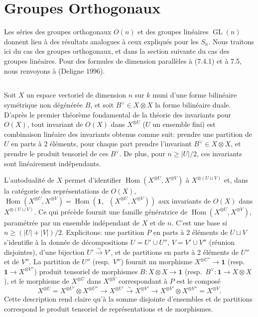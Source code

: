 \documentclass[11pt,a4paper]{article}
\theoremstyle{plain}
\theoremstyle{definition}
\DeclareMathOperator{\Hom}{Hom}
\DeclareMathOperator{\GL}{GL}
\newcommand{\isom}{\xrightarrow{\sim}}
\DeclareMathOperator{\iHom}{\underline{Hom}}
\begin{document}
\section{Groupes Orthogonaux}

Les s\'eries des groupes orthogonaux $O(n)$ et des groupes lin\'eaires $\GL(n)$ donnent lieu \`a des r\'esultats analogues \`a ceux expliqu\'es pour les $S_n$. Nous traitons ici du cas des groupes orthogonaux, et dans la section suivante du cas des groupes lin\'eaires. Pour des formules de dimension parall\`eles \`a (7.4.1) et \`a 7.5, nous renvoyons \`a (Deligne 1996).

\subsection{}
Soit $X$ un espace vectoriel de dimension $n$ sur $k$ muni d'une forme bilin\'eaire sym\'etrique non d\'eg\'en\'er\'ee $B$, et soit $B^\vee \in X \otimes X$ la forme bilin\'eaire duale. D'apr\`es le premier th\'eor\`eme fondamental de la th\'eorie des invariants pour $O(X)$, tout invariant de $O(X)$ dans $X^{\otimes U}$ ($U$ un ensemble fini) est combinaison lin\'eaire des invariants obtenus comme suit: prendre une partition de $U$ en parts \`a 2 \'el\'ements, pour chaque part prendre l'invariant $B^\vee \in X \otimes X$, et prendre le produit tensoriel de ces $B^\vee$. De plus, pour $n \geq |U|/2$, ces invariants sont lin\'eairement ind\'ependants.

L'autodualit\'e de $X$ permet d'identifier $\Hom(X^{\otimes U}, X^{\otimes V})$ \`a $X^{\otimes (U \sqcup V)}$ et, dans la cat\'egorie des repr\'esentations de $O(X)$, $\Hom(X^{\otimes U}, X^{\otimes V}) = \Hom(\mathbf{1}, \iHom(X^{\otimes U}, X^{\otimes V}))$ aux invariants de $O(X)$ dans $X^{\otimes (U \sqcup V)}$. Ce qui pr\'ec\`ede fournit une famille g\'en\'eratrice de $\Hom(X^{\otimes U}, X^{\otimes V})$, param\'etr\'ee par un ensemble ind\'ependant de $X$ et de $n$. C'est une base si $n \geq (|U| + |V|)/2$. Explicitons: une partition $P$ en parts \`a 2 \'el\'ements de $U \sqcup V$ s'identifie \`a la donn\'ee de d\'ecompositions $U = U' \cup U''$, $V = V' \cup V''$ (r\'eunion disjointes), d'une bijection $U' \isom V'$, et de partitions en parts \`a 2 \'el\'ements de $U''$ et de $V''$. La partition de $U''$ (resp.~$V''$) fournit un morphisme $X^{\otimes U''} \to \mathbf{1}$ (resp.~$\mathbf{1} \to X^{\otimes V''}$) produit tensoriel de morphismes $B : X \otimes X \to \mathbf{1}$ (resp.~$B^\vee : \mathbf{1} \to X \otimes X$), et le morphisme de $X^{\otimes U}$ dans $X^{\otimes V}$ correspondant \`a $P$ est le compos\'e
\[
X^{\otimes U} = X^{\otimes U'} \otimes X^{\otimes U''} \to X^{\otimes U'} \isom X^{\otimes V'} \to X^{\otimes V'} \otimes X^{\otimes V''} = X^{\otimes V}.
\]
Cette description rend claire qu'\`a la somme disjointe d'ensembles et de partitions correspond le produit tensoriel de repr\'esentations et de morphismes.
\end{document}
